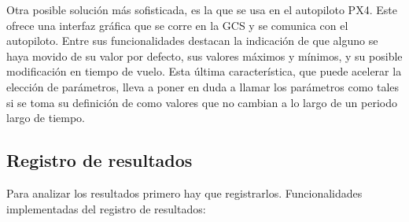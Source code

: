 Otra posible solución más sofisticada, es la que se usa en el autopiloto PX4. Este ofrece una interfaz gráfica que se corre en la GCS y se comunica con el autopiloto. Entre sus funcionalidades destacan la indicación de que alguno se haya movido de su valor por defecto, sus valores máximos y mínimos, y su posible modificación en tiempo de vuelo. Esta última característica, que puede acelerar la elección de parámetros, lleva a poner en duda a llamar los parámetros como tales si se toma su definición de como valores que no cambian a lo largo de un periodo largo de tiempo.  

\subsection{Registro de resultados}
Para analizar los resultados primero hay que registrarlos.
Funcionalidades implementadas del registro de resultados:
